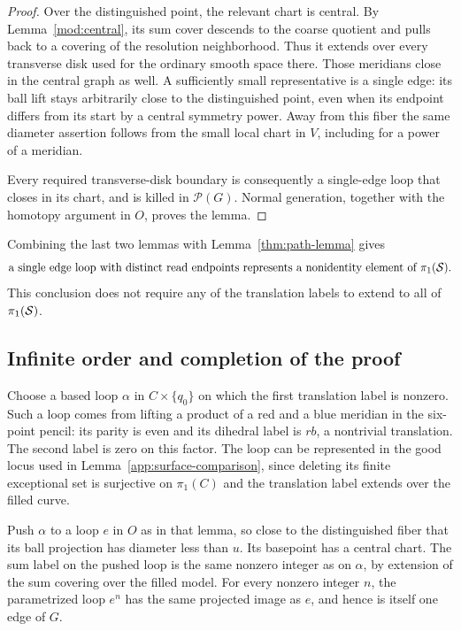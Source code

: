 \begin{proof}
Over the distinguished point, the relevant chart is central.  By
Lemma~\ref{mod:central}, its sum cover descends to the coarse quotient
and pulls back to a covering of the resolution neighborhood.  Thus
it extends over every transverse disk used for the ordinary smooth
space there.  Those meridians close in the central graph as well.
A sufficiently small representative is a single edge: its ball lift
stays arbitrarily close to the distinguished point, even when its
endpoint differs from its start by a central symmetry power.
Away from this fiber the same diameter assertion follows from the
small local chart in $V$, including for a power of a meridian.

Every required transverse-disk boundary is consequently a
single-edge loop that closes in its chart, and is killed in
$\mathcal P(G)$.  Normal generation, together with the homotopy
argument in $O$, proves the lemma.
\end{proof}

Combining the last two lemmas with Lemma~\ref{thm:path-lemma} gives
\begin{equation}\label{app:detection}
 \text{a single edge loop with distinct read endpoints represents a
 nonidentity element of }\pi_1(\mathcal S).
\end{equation}
This conclusion does not require any of the translation labels to
extend to all of $\pi_1(\mathcal S)$.

\subsection{Infinite order and completion of the proof}

Choose a based loop $\alpha$ in $C\times\{q_0\}$ on which the first
translation label is nonzero.  Such a loop comes from lifting a
product of a red and a blue meridian in the six-point pencil: its
parity is even and its dihedral label is $rb$, a nontrivial
translation.  The second label is zero on this factor.  The loop
can be represented in the good locus used in
Lemma~\ref{app:surface-comparison}, since deleting its finite
exceptional set is surjective on $\pi_1(C)$ and the translation label
extends over the filled curve.

Push $\alpha$ to a loop $e$ in $O$ as in that lemma, so close to the
distinguished fiber that its ball projection has diameter less than
$u$.  Its basepoint has a central chart.  The sum label on the pushed
loop is the same nonzero integer as on $\alpha$, by extension of the
sum covering over the filled model.  For every nonzero integer $n$,
the parametrized loop $e^n$ has the same projected image as $e$, and
hence is itself one edge of $G$.


